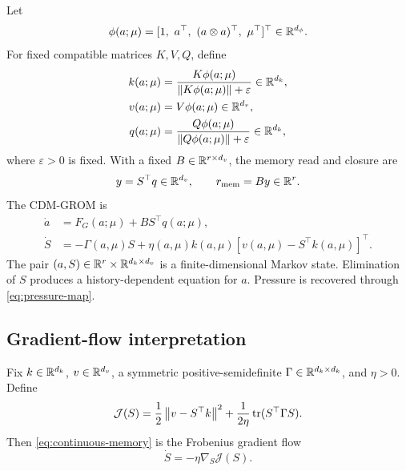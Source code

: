 Let
\begin{equation}
 \phi(a;\mu)=
 [1,\ a^\top,\ (a\otimes a)^\top,\ \mu^\top]^\top
 \in\mathbb{R}^{d_\phi}.
 \label{eq:analytic-features}
\end{equation}
For fixed compatible matrices $K,V,Q$, define
\begin{align}
 k(a;\mu)
 &=\frac{K\phi(a;\mu)}
 {\left\lVert K\phi(a;\mu)\right\rVert+\varepsilon}\in\mathbb{R}^{d_k},
 \label{eq:k-map}\\
 v(a;\mu)&=V\phi(a;\mu)\in\mathbb{R}^{d_v},
 \label{eq:v-map}\\
 q(a;\mu)
 &=\frac{Q\phi(a;\mu)}
 {\left\lVert Q\phi(a;\mu)\right\rVert+\varepsilon}\in\mathbb{R}^{d_k},
 \label{eq:q-map}
\end{align}
where $\varepsilon>0$ is fixed. With a fixed
$B\in\mathbb{R}^{r\times d_v}$, the memory read and closure are
\begin{equation}
 y=S^\top q\in\mathbb{R}^{d_v},\qquad r_{\mathrm{mem}}=By\in\mathbb{R}^r.
 \label{eq:memory-read}
\end{equation}
The CDM-GROM is
\begin{equation}
 \boxed{
 \begin{aligned}
 \dot a
 &=F_G(a;\mu)+BS^\top q(a;\mu),\\
 \dot S
 &=-\Gamma(a,\mu)S+
 \eta(a,\mu)k(a,\mu)
 [v(a,\mu)-S^\top k(a,\mu)]^\top.
 \end{aligned}}
 \label{eq:cdm-grom}
\end{equation}
The pair $(a,S)\in\mathbb{R}^r\times\mathbb{R}^{d_k\times d_v}$ is a finite-dimensional
Markov state. Elimination of $S$ produces a history-dependent equation for
$a$. Pressure is recovered through \eqref{eq:pressure-map}.

\subsection{Gradient-flow interpretation}
\label{sec:gradient-flow}

\label{prop:gradient-flow}
\begin{propositionone}
Fix $k\in\mathbb{R}^{d_k}$, $v\in\mathbb{R}^{d_v}$, a symmetric positive-semidefinite
$\Gamma\in\mathbb{R}^{d_k\times d_k}$, and $\eta>0$. Define
\begin{equation}
 \mathcal J(S)
 =\frac12\left\lVert v-S^\top k\right\rVert^2+
 \frac{1}{2\eta}\operatorname{tr}(S^\top\Gamma S).
 \label{eq:reconstruction-objective}
\end{equation}
Then \eqref{eq:continuous-memory} is the Frobenius gradient flow
\begin{equation}
 \dot S=-\eta\nabla_S\mathcal J(S).
 \label{eq:gradient-flow}
\end{equation}
\end{propositionone}

